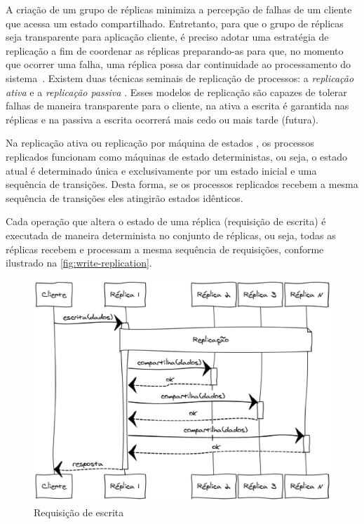 A criação de um grupo de réplicas minimiza a percepção de falhas de um cliente que acessa
um estado compartilhado. Entretanto, para que o grupo de réplicas seja transparente para
aplicação cliente, é preciso adotar uma estratégia de replicação a fim de coordenar as
réplicas preparando-as para que, no momento que ocorrer uma falha, uma réplica possa dar
continuidade ao processamento do sistema~\cite{jalote94}. Existem duas técnicas seminais
de replicação de processos: a \emph{replicação ativa} e a \emph{replicação passiva}
\cite{jalote94}. Esses modelos de replicação são capazes de tolerar falhas de maneira
transparente para o cliente, na ativa a escrita é garantida nas réplicas e na passiva a
escrita ocorrerá mais cedo ou mais tarde (futura).

Na replicação ativa \cite{coulouris11, guerraoui97} ou replicação por máquina de estados
\cite{schneider90}, os processos replicados funcionam como máquinas de estado
deterministas, ou seja, o estado atual é determinado única e exclusivamente por um estado
inicial e uma sequência de transições. Desta forma, se os processos replicados recebem a
mesma sequência de transições eles atingirão estados idênticos.

Cada operação que altera o estado de uma réplica (requisição de escrita) é executada de
maneira determinista no conjunto de réplicas, ou seja, todas as réplicas recebem e
processam a mesma sequência de requisições, conforme ilustrado na
\autoref{fig:write-replication}.

\begin{figure}[htbp]
  \centering
  \includegraphics[width=14.5cm]{conteudo/capitulos/figuras/escrita_replicacao.eps}
  \caption{Requisição de escrita}
  \label{fig:write-replication}
\end{figure}

